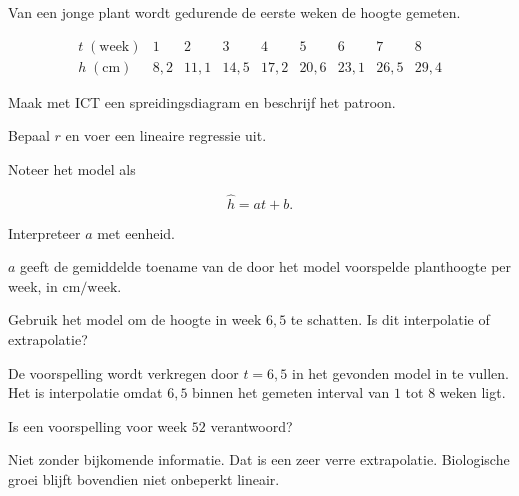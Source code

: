 \documentclass{ximera}
\begin{document}
\begin{oefening}{\oefU \ESS}

Van een jonge plant wordt gedurende de eerste weken de hoogte gemeten.

\[
\begin{array}{c|rrrrrrrr}
t\;(\mathrm{week})&1&2&3&4&5&6&7&8\\ \hline
h\;(\mathrm{cm})&8{,}2&11{,}1&14{,}5&17{,}2&20{,}6&23{,}1&26{,}5&29{,}4
\end{array}
\]

\begin{question}
Maak met ICT een spreidingsdiagram en beschrijf het patroon.
\end{question}

\begin{question}
Bepaal $r$ en voer een lineaire regressie uit.
\end{question}

\begin{question}
Noteer het model als

\[
\hat h=at+b.
\]
\end{question}

\begin{question}
Interpreteer $a$ met eenheid.

\begin{oplossing}
$a$ geeft de gemiddelde toename van de door het model voorspelde
planthoogte per week, in $\mathrm{cm/week}$.
\end{oplossing}
\end{question}

\begin{question}
Gebruik het model om de hoogte in week $6{,}5$ te schatten. Is dit
interpolatie of extrapolatie?

\begin{oplossing}
De voorspelling wordt verkregen door $t=6{,}5$ in het gevonden model
in te vullen. Het is interpolatie omdat $6{,}5$ binnen het gemeten
interval van $1$ tot $8$ weken ligt.
\end{oplossing}
\end{question}

\begin{question}
Is een voorspelling voor week $52$ verantwoord?

\begin{oplossing}
Niet zonder bijkomende informatie. Dat is een zeer verre extrapolatie.
Biologische groei blijft bovendien niet onbeperkt lineair.
\end{oplossing}
\end{question}
\end{oefening}
\end{document}
